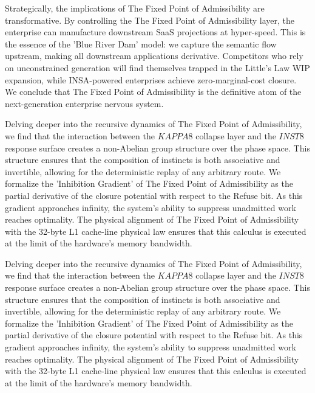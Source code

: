 \documentclass[12pt,a4paper,oneside]{book}
\begin{document}
Strategically, the implications of The Fixed Point of Admissibility are transformative. By controlling the The Fixed Point of Admissibility layer, the enterprise can manufacture downstream SaaS projections at hyper-speed. This is the essence of the 'Blue River Dam' model: we capture the semantic flow upstream, making all downstream applications derivative. Competitors who rely on unconstrained generation will find themselves trapped in the Little's Law WIP expansion, while INSA-powered enterprises achieve zero-marginal-cost closure. We conclude that The Fixed Point of Admissibility is the definitive atom of the next-generation enterprise nervous system. 

Delving deeper into the recursive dynamics of The Fixed Point of Admissibility, we find that the interaction between the $KAPPA8$ collapse layer and the $INST8$ response surface creates a non-Abelian group structure over the phase space. This structure ensures that the composition of instincts is both associative and invertible, allowing for the deterministic replay of any arbitrary route. We formalize the 'Inhibition Gradient' of The Fixed Point of Admissibility as the partial derivative of the closure potential with respect to the Refuse bit. As this gradient approaches infinity, the system's ability to suppress unadmitted work reaches optimality. The physical alignment of The Fixed Point of Admissibility with the 32-byte L1 cache-line physical law ensures that this calculus is executed at the limit of the hardware's memory bandwidth. 

Delving deeper into the recursive dynamics of The Fixed Point of Admissibility, we find that the interaction between the $KAPPA8$ collapse layer and the $INST8$ response surface creates a non-Abelian group structure over the phase space. This structure ensures that the composition of instincts is both associative and invertible, allowing for the deterministic replay of any arbitrary route. We formalize the 'Inhibition Gradient' of The Fixed Point of Admissibility as the partial derivative of the closure potential with respect to the Refuse bit. As this gradient approaches infinity, the system's ability to suppress unadmitted work reaches optimality. The physical alignment of The Fixed Point of Admissibility with the 32-byte L1 cache-line physical law ensures that this calculus is executed at the limit of the hardware's memory bandwidth. 
\end{document}
